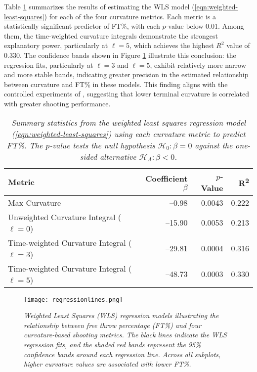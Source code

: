 \documentclass{article}
\begin{document}
    Table \ref{tab:wls-results} summarizes the results of estimating the WLS model (\ref{eqn:weighted-least-squares}) for each of the four curvature metrics. Each metric is a statistically significant predictor of FT\%, with each $p$-value below 0.01. Among them, the time-weighted curvature integrals demonstrate the strongest explanatory power, particularly at $\ell = 5$, which achieves the highest $R^2$ value of 0.330. The confidence bands shown in Figure \ref{fig:regressionlines} illustrate this conclusion: the regression fits, particularly at $\ell = 3$ and $\ell = 5$, exhibit relatively more narrow and more stable bands, indicating greater precision in the estimated relationship between curvature and FT\% in these models. This finding aligns with the controlled experiments of \citet{slegers_role_2024}, suggesting that lower terminal curvature is correlated with greater shooting performance.

    \begin{table}[H]
        \centering
        \begin{tabular}{lrrr}
        \toprule
        \textbf{Metric} & \textbf{Coefficient} $\beta$ & $p$-\textbf{Value} & \textbf{R\textsuperscript{2}}\\
        \midrule
        Max Curvature                               &   --0.98  & 0.0043  & 0.222 \\
        Unweighted Curvature Integral ($\ell=0$)    &  --15.90  & 0.0053  & 0.213 \\
        Time-weighted Curvature Integral ($\ell=3$) &  --29.81  & 0.0004  & 0.316 \\
        Time-weighted Curvature Integral ($\ell=5$) &  --48.73  & 0.0003  & 0.330 \\
        \bottomrule
        \end{tabular}
        \caption{\it Summary statistics from the weighted least squares regression model (\ref{eqn:weighted-least-squares}) using each curvature metric to predict FT\%. The $p$-value tests the null hypothesis $\mathcal{H}_0 : \beta = 0$ against the one-sided alternative $\mathcal{H}_A : \beta < 0$.}
        \label{tab:wls-results}
    \end{table}
    
    \begin{figure}[H]
        \centering
        \texttt{[image: regressionlines.png]}
        \caption{\it Weighted Least Squares (WLS) regression models illustrating the relationship between free throw percentage (FT\%) and four curvature-based shooting metrics. The black lines indicate the WLS regression fits, and the shaded red bands represent the 95\% confidence bands around each regression line. Across all subplots, higher curvature values are associated with lower FT\%.}
        \label{fig:regressionlines}
    \end{figure}
\end{document}
